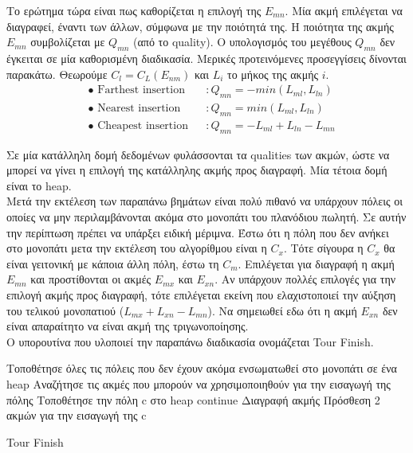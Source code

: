\documentclass[oneside,12pt]{book}
\theoremstyle{definition}
\begin{document}
Το ερώτημα τώρα είναι πως καθορίζεται η επιλογή της \(E_{mn}\). Μία ακμή επιλέγεται να διαγραφεί, έναντι των άλλων, σύμφωνα με την ποιότητά της. Η ποιότητα της ακμής \(E_{mn}\) συμβολίζεται με \(Q_{mn}\) (από το quality). Ο υπολογισμός του μεγέθους \(Q_{mn}\) δεν έγκειται σε μία καθορισμένη διαδικασία. Μερικές προτεινόμενες προσεγγίσεις δίνονται παρακάτω. Θεωρούμε \(C_l = C_L(E_{nm})\) και \(L_i\) το μήκος της ακμής \(i\). \\

\begin{align*}
	& \bullet \text{ Farthest insertion} &&: Q_{mn} = - min(L_{ml}, L_{ln}) \\
	& \bullet \text{ Nearest insertion} &&: Q_{mn} = min(L_{ml}, L_{ln}) \\
	& \bullet \text{ Cheapest insertion} &&: Q_{mn} = -L_{ml} + L_{ln} - L_{mn}
\end{align*}

Σε μία κατάλληλη δομή δεδομένων φυλάσσονται τα qualities των ακμών, ώστε να μπορεί να γίνει η επιλογή της κατάλληλης ακμής προς διαγραφή. Μία τέτοια δομή είναι το heap. \\

Μετά την εκτέλεση των παραπάνω βημάτων είναι πολύ πιθανό να υπάρχουν πόλεις οι οποίες να μην περιλαμβάνονται ακόμα στο μονοπάτι του πλανόδιου πωλητή. Σε αυτήν την περίπτωση πρέπει να υπάρξει ειδική μέριμνα. Έστω ότι η πόλη που δεν ανήκει στο μονοπάτι μετα την εκτέλεση του αλγορίθμου είναι η \(C_x\). Τότε σίγουρα η \(C_x\) θα είναι γειτονική με κάποια άλλη πόλη, έστω τη \(C_m\). Επιλέγεται για διαγραφή η ακμή \(E_{mn}\) και προστίθονται οι ακμές \(E_{mx}\) και \(E_{xn}\). Αν υπάρχουν πολλές επιλογές για την επιλογή ακμής προς διαγραφή, τότε επιλέγεται εκείνη που ελαχιστοποιεί την αύξηση του τελικού μονοπατιού (\(L_{mx} + L_{xn} - L_{mn}\)). Να σημειωθεί εδω ότι η ακμή \(E_{xn}\) δεν είναι απαραίτητο να είναι ακμή της τριγωνοποίησης. \\

Ο υπορουτίνα που υλοποιεί την παραπάνω διαδικασία ονομάζεται Tour Finish. \\

\begin{algorithm}[H]
	\SetAlgoLined

	Τοποθέτησε όλες τις πόλεις που δεν έχουν ακόμα ενσωματωθεί στο μονοπάτι σε ένα heap \;
	{Αναζήτησε τις ακμές που μπορούν να χρησιμοποιηθούν για την εισαγωγή της πόλης \;
	{Τοποθέτησε την πόλη c στο heap \;
	continue \;}
	Διαγραφή ακμής \;
	Πρόσθεση 2 ακμών για την εισαγωγή της c \;}

	\caption{Tour Finish}
\end{algorithm}
\end{document}
